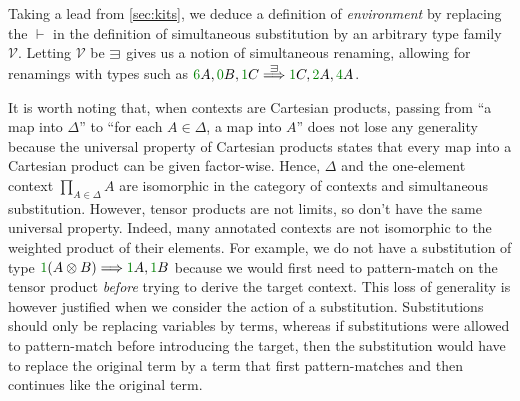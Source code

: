 Taking a lead from \cref{sec:kits}, we deduce a definition of
\emph{environment} by replacing the $\vdash$ in the definition of simultaneous
substitution by an arbitrary type family $\mathcal V$.
Letting $\mathcal V$ be $\sqni$ gives us a notion of simultaneous renaming,
allowing for renamings with types such as
$\gr6A, \gr0B, \gr1C \stackrel\sqni\Longrightarrow \gr1C, \gr2A, \gr4A$.

It is worth noting that, when contexts are Cartesian products, passing from
``a map into $\Delta$'' to ``for each $A \in \Delta$, a map into $A$'' does not
lose any generality because the universal property of Cartesian products
states that every map into a Cartesian product can be given factor-wise.
Hence, $\Delta$ and the one-element context $\prod_{A \in \Delta}A$ are
isomorphic in the category of contexts and simultaneous substitution.
However, tensor products are not limits, so don't have the same universal
property.
Indeed, many annotated contexts are not isomorphic to the weighted product of
their elements.
For example, we do not have a substitution of type
$\gr1(A \otimes B) \Longrightarrow \gr1A, \gr1B$ because we would first need
to pattern-match on the tensor product \emph{before} trying to derive the
target context.
This loss of generality is however justified when we consider the action of a
substitution.
Substitutions should only be replacing variables by terms, whereas if
substitutions were allowed to pattern-match before introducing the target, then
the substitution would have to replace the original term by a term that first
pattern-matches and then continues like the original term.
